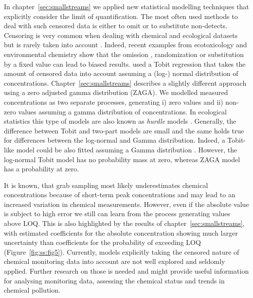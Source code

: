 In chapter~\ref{sec:smallstreams} we applied new statistical modelling techniques that explicitly consider the limit of quantification.
The most often used methods to deal with such censored data is either to omit or to substitute non-detects. 
Censoring is very common when dealing with chemical and ecological datasets but is rarely taken into account \citep{fox_ecological_2015}. 
Indeed, recent examples from ecotoxicology and environmental chemistry show that the omission \citep{hansen_re-evaluation_2015}, randomization \citep{goulson_neonicotinoids_2015} or substitution by a fixed value \citep{helsel_much_2010, helsel_fabricating_2006} can lead to biased results.
\citet{hansen_re-evaluation_2015} used a Tobit regression \citep{tobin_estimation_1958} that takes the amount of censored data into account assuming a (log-) normal distribution of concentrations.
Chapter~\ref{sec:smallstreams} describes a slightly different approach using a zero adjusted gamma distribution (ZAGA).
We modelled measured concentrations as two separate processes, generating i) zero values and ii) non-zero values assuming a gamma distribution of concentrations.
In ecological statistics this type of models are also known as \emph{hurdle} models \citep{martin_zero_2005}. 
Generally, the difference between Tobit and two-part models are small \citep{min_modeling_2002} and the same holds true for differences between the log-normal and Gamma distribution. 
Indeed, a Tobit-like model could be also fitted assuming a Gamma distribution \citep{sigrist_using_2010}.
However, the log-normal Tobit model has no probability mass at zero, whereas ZAGA model has a probability at zero. 

It is known, that grab sampling most likely underestimates chemical concentrations because of short-term peak concentrations \citep{xing_influences_2013, stehle_probabilistic_2013} and may lead to an increased variation in chemical measurements.
However, even if the absolute value is subject to high error we still can learn from the process generating values above LOQ.
This is also highlighted by the results of chapter~\ref{sec:smallstreams}, with estimated coefficients for the absolute concentration showing much larger uncertainty than coefficients for the probability of exceeding LOQ (Figure~\ref{fig:ss:fig5}). 
Currently, models explicitly taking the censored nature of chemical monitoring data into account are not well explored and seldomly applied.
Further research on those is needed and might provide useful information for analysing monitoring data, assessing the chemical status and trends in chemical pollution.




